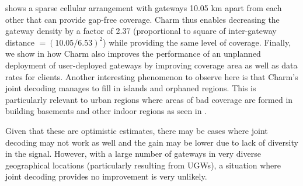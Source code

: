  shows a sparse cellular arrangement with gateways 10.05 km apart from each other that can provide gap-free coverage. Charm thus enables decreasing the gateway density by a factor of 2.37 (proportional to square of inter-gateway distance $=(10.05/6.53)^2$) while providing the same level of coverage. Finally, we show in  how Charm also improves the performance of an unplanned deployment of user-deployed gateways by improving coverage area as well as data rates for clients. Another interesting phenomenon to observe here is that Charm's joint decoding manages to fill in islands and orphaned regions. This is particularly relevant to urban regions where areas of bad coverage are formed in building basements and other indoor regions as seen in .

Given that these are optimistic estimates, there may be cases where joint decoding may not work as well and the gain may be lower due to lack of diversity in the signal. However, with a large number of gateways in very diverse geographical locations (particularly resulting from UGWs), a situation where joint decoding provides no improvement is very unlikely.

